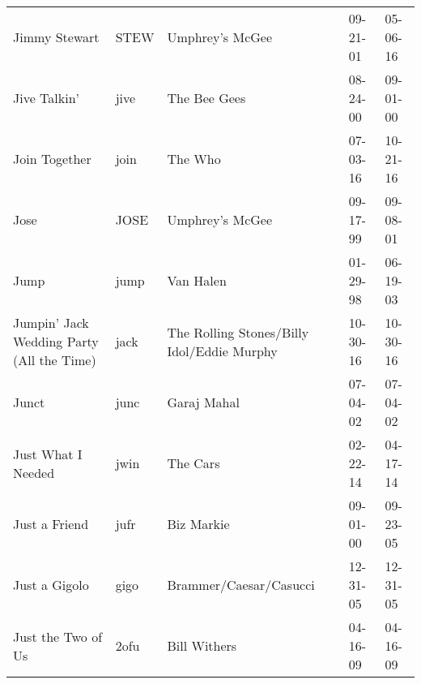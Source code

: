 \begin{longtable}{p{}p{}p{}p{}p{}}
                                                           Jimmy Stewart &          STEW &                                          Umphrey's McGee &              09-21-01 &             05-06-16 \\
                                                            Jive Talkin' &          jive &                                             The Bee Gees &              08-24-00 &             09-01-00 \\
                                                           Join Together &          join &                                                  The Who &              07-03-16 &             10-21-16 \\
                                                                    Jose &          JOSE &                                          Umphrey's McGee &              09-17-99 &             09-08-01 \\
                                                                    Jump &          jump &                                                Van Halen &              01-29-98 &             06-19-03 \\
                               Jumpin' Jack Wedding Party (All the Time) &          jack &               The Rolling Stones/Billy Idol/Eddie Murphy &              10-30-16 &             10-30-16 \\
                                                                   Junct &          junc &                                              Garaj Mahal &              07-04-02 &             07-04-02 \\
                                                      Just What I Needed &          jwin &                                                 The Cars &              02-22-14 &             04-17-14 \\
                                                           Just a Friend &          jufr &                                               Biz Markie &              09-01-00 &             09-23-05 \\
                                                           Just a Gigolo &          gigo &                                   Brammer/Caesar/Casucci &              12-31-05 &             12-31-05 \\
                                                      Just the Two of Us &          2ofu &                                             Bill Withers &              04-16-09 &             04-16-09 \\

\end{longtable}
